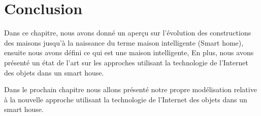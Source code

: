 \section{Conclusion}
Dans ce chapitre, nous avons donné un aperçu sur l’évolution des constructions des maisons jusqu'à la naissance du terme maison intelligente (Smart home), ensuite nous avons défini  ce qui est une maison intelligente, En plus, nous avons présenté un état de l’art sur les approches utilisant la technologie de l’Internet des objets  dans un smart  house. 


Dans le prochain chapitre nous allons présenté notre propre modélisation relative à la nouvelle approche utilisant la technologie de l’Internet des objets  dans un smart  house. 
